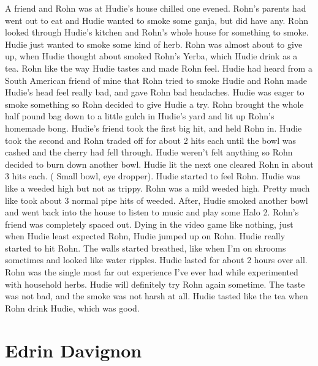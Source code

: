 \documentclass[12pt]{book}
\begin{document}
A friend and Rohn was at Hudie's house chilled one evened. Rohn's parents had went out to eat and Hudie wanted to smoke some ganja, but did have any. Rohn looked through Hudie's kitchen and Rohn's whole house for something to smoke. Hudie just wanted to smoke some kind of herb. Rohn was almost about to give up, when Hudie thought about smoked Rohn's Yerba, which Hudie drink as a tea. Rohn like the way Hudie tastes and made Rohn feel. Hudie had heard from a South American friend of mine that Rohn tried to smoke Hudie and Rohn made Hudie's head feel really bad, and gave Rohn bad headaches. Hudie was eager to smoke something so Rohn decided to give Hudie a try. Rohn brought the whole half pound bag down to a little gulch in Hudie's yard and lit up Rohn's homemade bong. Hudie's friend took the first big hit, and held Rohn in. Hudie took the second and Rohn traded off for about 2 hits each until the bowl was cashed and the cherry had fell through. Hudie weren't felt anything so Rohn decided to burn down another bowl. Hudie lit the next one cleared Rohn in about 3 hits each. ( Small bowl, eye dropper). Hudie started to feel Rohn. Hudie was like a weeded high but not as trippy. Rohn was a mild weeded high. Pretty much like took about 3 normal pipe hits of weeded. After, Hudie smoked another bowl and went back into the house to listen to music and play some Halo 2. Rohn's friend was completely spaced out. Dying in the video game like nothing, just when Hudie least expected Rohn, Hudie jumped up on Rohn. Hudie really started to hit Rohn. The walls started breathed, like when I'm on shrooms sometimes and looked like water ripples. Hudie lasted for about 2 hours over all. Rohn was the single most far out experience I've ever had while experimented with household herbs. Hudie will definitely try Rohn again sometime. The taste was not bad, and the smoke was not harsh at all. Hudie tasted like the tea when Rohn drink Hudie, which was good.



\chapter{Edrin Davignon}
\end{document}
